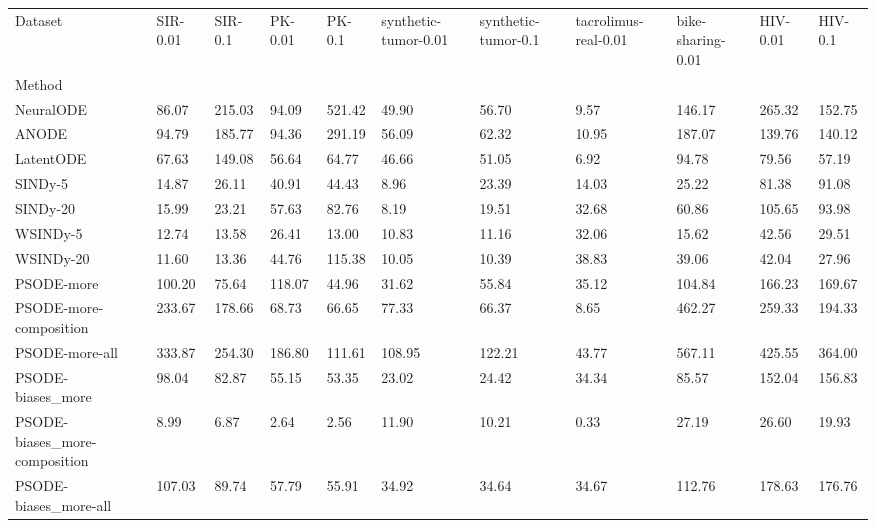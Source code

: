 \begin{tabular}{lllllllllll}
\toprule
Dataset & SIR-0.01 & SIR-0.1 & PK-0.01 & PK-0.1 & synthetic-tumor-0.01 & synthetic-tumor-0.1 & tacrolimus-real-0.01 & bike-sharing-0.01 & HIV-0.01 & HIV-0.1 \\
Method &  &  &  &  &  &  &  &  &  &  \\
\midrule
NeuralODE & 86.07 & 215.03 & 94.09 & 521.42 & 49.90 & 56.70 & 9.57 & 146.17 & 265.32 & 152.75 \\
ANODE & 94.79 & 185.77 & 94.36 & 291.19 & 56.09 & 62.32 & 10.95 & 187.07 & 139.76 & 140.12 \\
LatentODE & 67.63 & 149.08 & 56.64 & 64.77 & 46.66 & 51.05 & 6.92 & 94.78 & 79.56 & 57.19 \\
SINDy-5 & 14.87 & 26.11 & 40.91 & 44.43 & 8.96 & 23.39 & 14.03 & 25.22 & 81.38 & 91.08 \\
SINDy-20 & 15.99 & 23.21 & 57.63 & 82.76 & 8.19 & 19.51 & 32.68 & 60.86 & 105.65 & 93.98 \\
WSINDy-5 & 12.74 & 13.58 & 26.41 & 13.00 & 10.83 & 11.16 & 32.06 & 15.62 & 42.56 & 29.51 \\
WSINDy-20 & 11.60 & 13.36 & 44.76 & 115.38 & 10.05 & 10.39 & 38.83 & 39.06 & 42.04 & 27.96 \\
PSODE-more & 100.20 & 75.64 & 118.07 & 44.96 & 31.62 & 55.84 & 35.12 & 104.84 & 166.23 & 169.67 \\
PSODE-more-composition & 233.67 & 178.66 & 68.73 & 66.65 & 77.33 & 66.37 & 8.65 & 462.27 & 259.33 & 194.33 \\
PSODE-more-all & 333.87 & 254.30 & 186.80 & 111.61 & 108.95 & 122.21 & 43.77 & 567.11 & 425.55 & 364.00 \\
PSODE-biases_more & 98.04 & 82.87 & 55.15 & 53.35 & 23.02 & 24.42 & 34.34 & 85.57 & 152.04 & 156.83 \\
PSODE-biases_more-composition & 8.99 & 6.87 & 2.64 & 2.56 & 11.90 & 10.21 & 0.33 & 27.19 & 26.60 & 19.93 \\
PSODE-biases_more-all & 107.03 & 89.74 & 57.79 & 55.91 & 34.92 & 34.64 & 34.67 & 112.76 & 178.63 & 176.76 \\
\bottomrule
\end{tabular}

